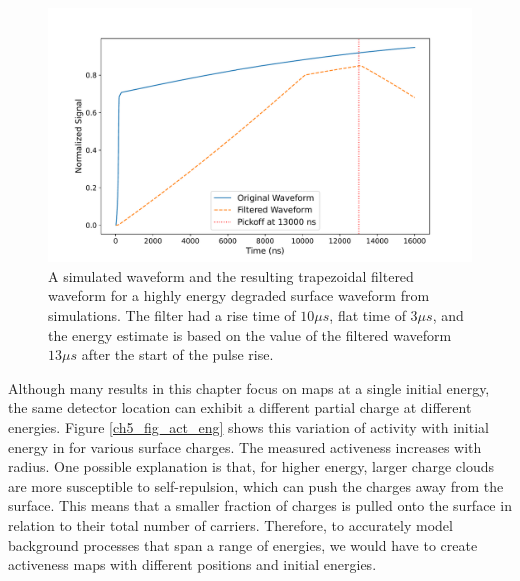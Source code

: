 \begin{figure}%
\centering
\includegraphics[trim={1cm 0cm 1cm 0cm},clip,width=0.99\linewidth]{ch5/figs/trap_example.pdf}
\caption{A simulated waveform and the resulting trapezoidal filtered waveform for a highly energy degraded surface waveform from {\ehd} simulations. The filter had a rise time of $10 \mu s$, flat time of $3 \mu s$, and the energy estimate is based on the value of the filtered waveform $13 \mu s$ after the start of the pulse rise.}
\label{ch5_fig_trap_filter}
\end{figure}

Although many results in this chapter focus on maps at a single initial energy, the same detector location can exhibit a different partial charge at different energies. 
Figure \ref{ch5_fig_act_eng} shows this variation of activity with initial energy in {\ponama} for various surface charges. The measured activeness increases with radius. One possible explanation is that, for higher energy, larger charge clouds are more susceptible to self-repulsion, which can push the charges away from the surface. This means that a smaller fraction of charges is pulled onto the surface in relation to their total number of carriers. Therefore, to accurately model background processes that span a range of energies, we would have to create activeness maps with different positions and initial energies.

